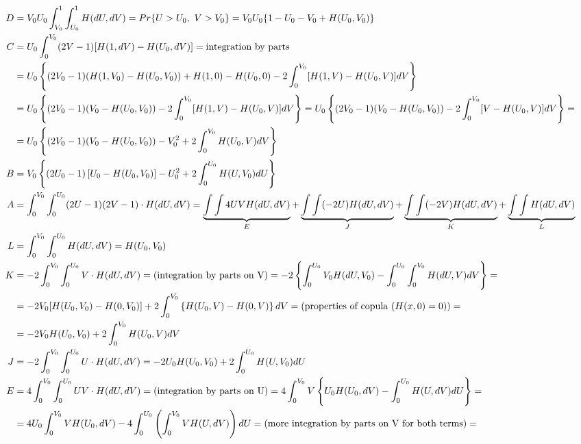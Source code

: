 \documentclass[]{article}
\begin{document}
{\scriptsize{
	$$
	\begin{aligned}
    D &= V_0 U_0 \int_{V_0}^{1}\int_{U_0}^1 H(dU, dV) = Pr\{ U > U_0,~V > V_0\} = V_0 U_0 \large\{1 - U_0 - V_0  + H(U_0, V_0)\large\}\\
    C &= U_0\int_{0}^{V_0} (2V - 1)[H(1, dV) - H(U_0, dV)] = \text{integration by parts}\\
     &= U_0  \left\{  (2V_0 - 1)(H(1, V_0) - H(U_0, V_0)) +H(1, 0) - H(U_0, 0)  - 2 \int_0^{V_0} [H(1, V) - H(U_0, V)]dV   \right\}\\
     &= U_0  \left\{  (2V_0 - 1)(V_0 - H(U_0, V_0)) - 2 \int_0^{V_0} [H(1, V) - H(U_0, V)]dV   \right\}
     = U_0  \left\{  (2V_0 - 1)(V_0 - H(U_0, V_0)) - 2 \int_0^{V_0} [V - H(U_0, V)]dV   \right\} = \\
     & = U_0  \left\{  (2V_0 - 1)(V_0 - H(U_0, V_0)) - V_0^2 + 2 \int_0^{V_0} H(U_0, V)dV   \right\}\\
    B &= V_0 \left\{  (2U_0 - 1) \left[U_0 - H(U_0, V_0)\right]  - U_0^2 + 2 \int_0^{U_0} H(U, V_0)dU  \right\}\\
    A &= \int_0^{V_0}\int_0^{U_0} (2U - 1)(2V - 1)\cdot H(dU, dV) =  \underbrace{\int\int 4UV H(dU, dV)}_{E} + \underbrace{\int\int (-2U) H(dU, dV)}_{J} + \underbrace{\int\int (-2V) H(dU, dV)}_{K} + \underbrace{\int\int H(dU, dV)}_{L}\\
    L &= \int_0^{V_0}\int_0^{U_0} H(dU, dV) = H(U_0, V_0)\\
    K &= -2\int_0^{V_0}\int_0^{U_0} V \cdot H(dU, dV) = \text{(integration by parts on V)} = -2 \left\{    \int_0^{U_0}V_0 H(dU, V_0) - \int_0^{U_0} \int_0^{V_0} H(dU, V) dV    \right\} =\\
    &= -2  V_0 [H(U_0, V_0) - H(0, V_0)] +  2 \int_0^{V_0} \left\{ H(U_0, V) - H(0, V)  \right\} dV = \text{(properties of copula ($H(x,0) = 0)$)} =\\
    &=  -2  V_0 H(U_0, V_0) +  2 \int_0^{V_0} H(U_0, V) dV\\
    J &= -2\int_0^{V_0}\int_0^{U_0} U  \cdot H(dU, dV) = -2  U_0 H(U_0, V_0) +  2 \int_0^{U_0}  H(U, V_0)dU \\
    E &= 4\int_0^{V_0}\int_0^{U_0} U V \cdot  H(dU, dV)  = \text{(integration by parts on U)} = 4\int_0^{V_0} V \left\{  U_0H(U_0, dV)  -  \int_0^{U_0} H(U, dV)dU  \right\} =\\
    &= 4 U_0\int_0^{V_0} V H(U_0, dV)  -  4\int_0^{U_0} \left( \int_0^{V_0} V H(U, dV)  \right) dU = \text{(more integration by parts on V for both terms)} = \\

\end{aligned}$$}}
\end{document}
